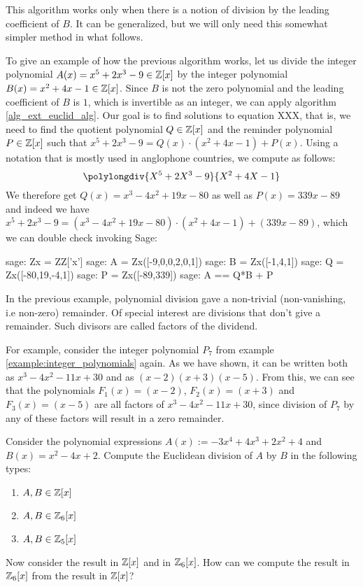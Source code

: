 This algorithm works only when there is a notion of division by the leading coefficient of $B$. It can be generalized, but we will only need this somewhat simpler method in what follows.
\begin{example} To give an example of how the previous algorithm works, let us divide the integer polynomial $A(x)=x^5+2x^3-9\in \mathbb{Z}[x]$ by the integer polynomial $B(x)=x^2+4x-1\in\mathbb{Z}[x]$. Since $B$ is not the zero polynomial and the leading coefficient of $B$ is $1$, which is invertible as an integer, we can apply algorithm \ref{alg_ext_euclid_alg}. Our goal is to find solutions to equation XXX, that is, we need to find the quotient polynomial $Q\in\mathbb{Z}[x]$ and the reminder polynomial $P \in \mathbb{Z}[x]$ such that $x^5+2x^3-9 = Q(x)\cdot (x^2+4x-1) + P(x)$. Using a notation that is mostly used in anglophone countries, we compute as follows:
\begin{equation}
\polylongdiv{X^5+2X^3-9}{X^2+4X-1}
\end{equation}
We therefore get $Q(x)=x^3-4x^2+19x-80$ as well as $P(x)=339x-89$ and indeed we have $x^5+2x^3-9 = (x^3-4x^2+19x-80)\cdot (x^2+4x-1) + (339x-89)$, which we can double check invoking Sage:
\begin{sagecommandline}
sage: Zx = ZZ['x']
sage: A = Zx([-9,0,0,2,0,1])
sage: B = Zx([-1,4,1])
sage: Q = Zx([-80,19,-4,1])
sage: P = Zx([-89,339])
sage: A == Q*B + P
\end{sagecommandline}
\end{example}
\begin{example} In the previous example, polynomial division gave a non-trivial (non-vanishing, i.e non-zero) remainder. Of special interest are divisions that don't give a remainder. Such divisors are called factors of the dividend. 

For example, consider the integer polynomial $P_7$ from example \ref{example:integer_polynomials} again. As we have shown, it can be written both as $x^3 - 4 x^2 - 11 x + 30$ and as $(x-2)(x + 3)(x-5)$. From this, we can see that the polynomials $F_1(x)=(x-2)$, $F_2(x)=(x+3)$ and $F_3(x)=(x-5)$ are all factors of $x^3 - 4 x^2 - 11 x + 30$, since division of $P_7$ by any of these factors will result in a zero remainder.
\end{example}
\begin{exercise} Consider the polynomial expressions $A(x):= -3x^4 + 4x^3 + 2x^2 +4$ and $B(x)= x^2-4x+2$. Compute the Euclidean division of $A$ by $B$ in the following types:
\begin{enumerate}
\item $A,B\in \mathbb{Z}[x]$
\item $A,B\in \mathbb{Z}_6[x]$
\item $A,B\in \mathbb{Z}_5[x]$
\end{enumerate}
Now consider the result in $\mathbb{Z}[x]$ and in $\mathbb{Z}_6[x]$. How can we compute the result in $\mathbb{Z}_6[x]$ from the result in $\mathbb{Z}[x]$?
\end{exercise}
